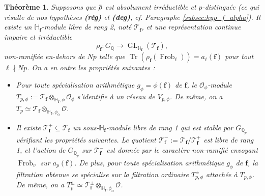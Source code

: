 \documentclass[12pt]{amsart}
\newcommand\bQ{\mathbb{Q}}
\newcommand\bH{\mathbb{H}}
\newcommand\Qp{\mathbb{Q}_{p}}
\newcommand\cO{\mathcal{O}}
\newcommand\cT{\mathcal{T}}
\newcommand{\ob}[1]{\mkern 1.5mu\overline{\mkern-1.5mu#1\mkern-1.5mu}\mkern 1.5mu}
\DeclareMathOperator{\Tr}{Tr}
\DeclareMathOperator{\Frob}{Frob}
\DeclareMathOperator{\GL}{GL}
\theoremstyle{defstyle}
\theoremstyle{thmstyle}
\newtheorem{theorem}[subsubsection]{Théorème}
\begin{document}
\begin{theorem}\label{bigT}
	Supposons que $\ob{\rho}$ est absolument irréductible et $p$-distinguée (ce qui résulte de nos hypothèses \textbf{(rég)} et \textbf{(deg)}, cf. Paragraphe \ref{subsec:hyp_f_alpha}). Il existe un $\bH_\textbf{f}$-module libre de rang 2, noté $\cT_\textbf{f}$, et une représentation continue impaire et irréductible 
	$$\rho_\textbf{f} : G_\bQ \longrightarrow \GL_{\bH_\textbf{f}}(\cT_\textbf{f}),$$
	non-ramifiée en-dehors de $Np$ telle que
	$\Tr(\rho_\textbf{f}(\Frob_\ell))=a_\ell(\textbf{f})$ pour tout $\ell\nmid Np$. On a en outre les propriétés suivantes :
	\begin{itemize}
		\item Pour toute spécialisation arithmétique $g_\phi=\phi(\textbf{f})$ de $\textbf{f}$, le $\cO_{\phi}$-module $T_{p,\phi}:=\cT_\textbf{f} \otimes_{\bH_\textbf{f},\phi} \cO_{\phi}$  s'identifie à un réseau de $V_{p,\phi}$. De même, on a $T_p \simeq \cT_\textbf{f} \otimes_{\bH_\textbf{f},\phi_{\alpha}} \cO$.  
		\item  Il existe $\cT^+_\textbf{f} \subseteq \cT_\textbf{f}$ un sous-$\bH_\textbf{f}$-module libre de rang 1 qui est stable par $G_{\Qp}$ vérifiant les propriétés suivantes. Le quotient $\cT^-_\textbf{f}:=\cT_\textbf{f}/\cT^+_\textbf{f}$ est libre de rang 1, et l'action de $G_{\Qp}$ sur $\cT_\textbf{f}^-$ est donnée par le caractère non-ramifié envoyant $\Frob_v$ sur $a_p(\textbf{f})$. De plus, pour toute spécialisation arithmétique $g_\phi$ de $\textbf{f}$, la filtration obtenue se spécialise sur la filtration ordinaire $T^\pm_{p,\phi}$ attachée à $T_{p,\phi}$. De même, on a $T_p^\pm\simeq \cT_\textbf{f}^\pm \otimes_{\bH_\textbf{f},\phi_{\alpha}} \cO$.
	\end{itemize}
\end{theorem}
\end{document}
